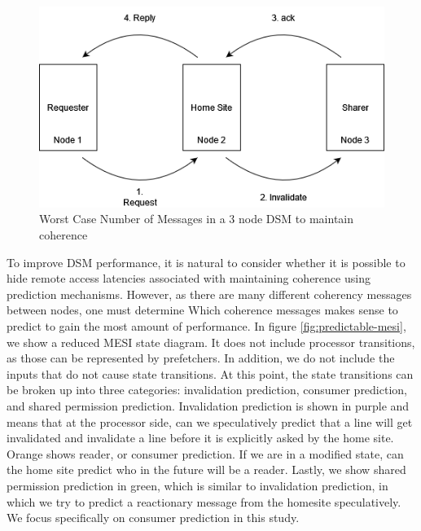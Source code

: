     \begin{figure}[h!]
    \centering
    \includegraphics[scale=0.45]{img/worse_case.png}
    \caption{Worst Case Number of Messages in a 3 node DSM to maintain coherence}
    \label{fig:worst-case}
    \end{figure}

    To improve DSM performance, it is natural to consider whether it is possible to hide remote access latencies associated with maintaining coherence using prediction mechanisms. However, as there are many different coherency messages between nodes, one must determine Which coherence messages makes sense to predict to gain the most amount of performance. In figure \ref{fig:predictable-mesi}, we show a reduced MESI state diagram. It does not include processor transitions, as those can be represented by prefetchers. In addition, we do not include the inputs that do not cause state transitions. At this point, the state transitions can be broken up into three categories: invalidation prediction, consumer prediction, and shared permission prediction. Invalidation prediction is shown in purple and means that at the processor side, can we speculatively predict that a line will get invalidated and invalidate a line before it is explicitly asked by the home site. Orange shows reader, or consumer prediction. If we are in a modified state, can the home site predict who in the future will be a reader. Lastly, we show shared permission prediction in green, which is similar to invalidation prediction, in which we try to predict a reactionary message from the homesite speculatively. We focus specifically on consumer prediction in this study. 

